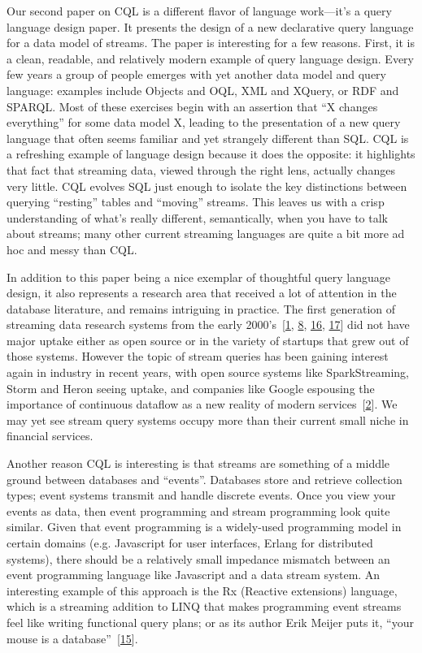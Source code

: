 \documentclass[b5paper,11pt,twoside,openright]{book}
\begin{document}
Our second paper on CQL is a different flavor of language work---it's a
query language design paper. It presents the design of a new declarative
query language for a data model of streams. The paper is interesting for
a few reasons. First, it is a clean, readable, and relatively modern
example of query language design. Every few years a group of people
emerges with yet another data model and query language: examples include
Objects and OQL, XML and XQuery, or RDF and SPARQL. Most of these
exercises begin with an assertion that ``X changes everything'' for some
data model X, leading to the presentation of a new query language that
often seems familiar and yet strangely different than SQL. CQL is a
refreshing example of language design because it does the opposite: it
highlights that fact that streaming data, viewed through the right lens,
actually changes very little. CQL evolves SQL just enough to isolate the
key distinctions between querying ``resting'' tables and ``moving''
streams. This leaves us with a crisp understanding of what's really
different, semantically, when you have to talk about streams; many other
current streaming languages are quite a bit more ad hoc and messy than
CQL.

In addition to this paper being a nice exemplar of thoughtful query
language design, it also represents a research area that received a lot
of attention in the database literature, and remains intriguing in
practice. The first generation of streaming data research systems from
the early 2000's~{{[}\protect\hyperlink{ref-abadi2003aurora}{1},
  \protect\hyperlink{ref-chandrasekarantelegraphcq}{8},
  \protect\hyperlink{ref-motwani2003query}{16},
  \protect\hyperlink{ref-naughton2001niagara}{17}{]}} did not have major
uptake either as open source or in the variety of startups that grew out
of those systems. However the topic of stream queries has been gaining
interest again in industry in recent years, with open source systems
like SparkStreaming, Storm and Heron seeing uptake, and companies like
Google espousing the importance of continuous dataflow as a new reality
of modern services~{{[}\protect\hyperlink{ref-googledataflow}{2}{]}}. We
may yet see stream query systems occupy more than their current small
niche in financial services.

Another reason CQL is interesting is that streams are something of a
middle ground between databases and ``events''. Databases store and
retrieve collection types; event systems transmit and handle discrete
events. Once you view your events as data, then event programming and
stream programming look quite similar. Given that event programming is a
widely-used programming model in certain domains (e.g. Javascript for
user interfaces, Erlang for distributed systems), there should be a
relatively small impedance mismatch between an event programming
language like Javascript and a data stream system. An interesting
example of this approach is the Rx (Reactive extensions) language, which
is a streaming addition to LINQ that makes programming event streams
feel like writing functional query plans; or as its author Erik Meijer
puts it, ``your mouse is a
database''~{{[}\protect\hyperlink{ref-meijer2012your}{15}{]}}.
\end{document}
